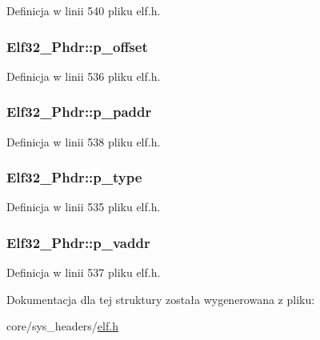 Definicja w linii 540 pliku elf.\-h.

\hypertarget{struct_elf32___phdr_ac590d4c4b26104216e53058b5b03eef0}{
\subsubsection[{p\-\_\-offset}]{ Elf32\-\_\-\-Phdr\-::p\-\_\-offset}}\label{struct_elf32___phdr_ac590d4c4b26104216e53058b5b03eef0}


Definicja w linii 536 pliku elf.\-h.

\hypertarget{struct_elf32___phdr_af18f0a179a5fca09e3c04bcdce3fac2f}{
\subsubsection[{p\-\_\-paddr}]{ Elf32\-\_\-\-Phdr\-::p\-\_\-paddr}}\label{struct_elf32___phdr_af18f0a179a5fca09e3c04bcdce3fac2f}


Definicja w linii 538 pliku elf.\-h.

\hypertarget{struct_elf32___phdr_a8b1d2942ddb9abcb85db1429b5116923}{
\subsubsection[{p\-\_\-type}]{ Elf32\-\_\-\-Phdr\-::p\-\_\-type}}\label{struct_elf32___phdr_a8b1d2942ddb9abcb85db1429b5116923}


Definicja w linii 535 pliku elf.\-h.

\hypertarget{struct_elf32___phdr_a01a298ebc899bcf9c23211a7bf1155a6}{
\subsubsection[{p\-\_\-vaddr}]{ Elf32\-\_\-\-Phdr\-::p\-\_\-vaddr}}\label{struct_elf32___phdr_a01a298ebc899bcf9c23211a7bf1155a6}


Definicja w linii 537 pliku elf.\-h.



Dokumentacja dla tej struktury została wygenerowana z pliku\-:\begin{DoxyCompactItemize}
\item 
core/sys\-\_\-headers/\hyperlink{elf_8h}{elf.\-h}\end{DoxyCompactItemize}

